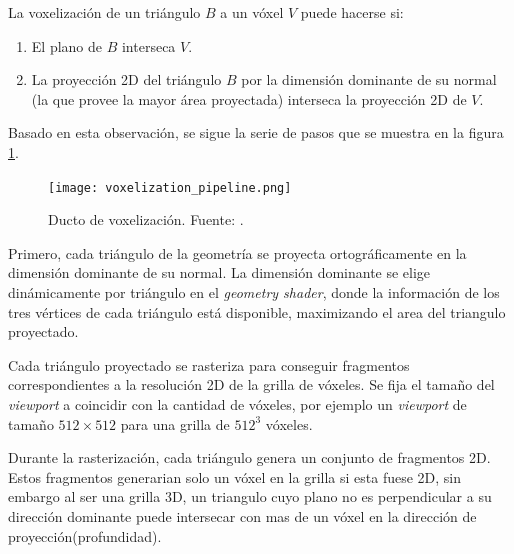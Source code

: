 La voxelización de un triángulo $B$ a un vóxel $V$ puede hacerse si:

\begin{enumerate}
    \item El plano de $B$ interseca $V$.
    \item La proyección 2D del triángulo $B$ por la dimensión dominante de su normal (la que provee la mayor área proyectada) interseca la proyección 2D de $V$.
\end{enumerate}

Basado en esta observación, se sigue la serie de pasos que se muestra en la figura \ref{fig:voxelization_pipeline}.

\begin{figure}[h!]
    \centering
    \texttt{[image: voxelization\_pipeline.png]}
    \caption{Ducto de voxelización. Fuente: \cite{opengl-insights}.}
    \label{fig:voxelization_pipeline}
\end{figure}

Primero, cada triángulo de la geometría se proyecta ortográficamente en la dimensión dominante de su normal.
La dimensión dominante se elige dinámicamente por triángulo en el \textit{geometry shader}, donde la información de los tres vértices de cada triángulo está disponible,
maximizando el area del triangulo proyectado.

Cada triángulo proyectado se rasteriza para conseguir fragmentos correspondientes a la resolución 2D de la grilla de vóxeles.
Se fija el tamaño del \textit{viewport} a coincidir con la cantidad de vóxeles, por ejemplo un \textit{viewport} de tamaño $512\times512$ para una grilla de $512^3$ vóxeles.

Durante la rasterización, cada triángulo genera un conjunto de fragmentos 2D.
Estos fragmentos generarian solo un vóxel en la grilla si esta fuese 2D, sin embargo al ser una grilla 3D, un triangulo cuyo plano no es perpendicular a su dirección dominante puede intersecar con mas de un vóxel en la dirección de proyección(profundidad).

